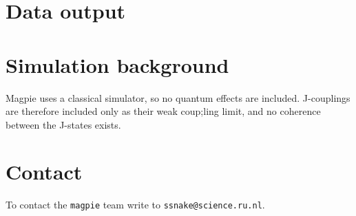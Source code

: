 \documentclass[11pt,a4paper]{article}
\begin{document}
\section{Data output}

\section{Simulation background}
Magpie uses a classical simulator, so no quantum effects are included. J-couplings are therefore included only as their weak coup;ling limit, and no coherence between the J-states exists.



\section{Contact}
To contact the \texttt{magpie} team write to \texttt{ssnake@science.ru.nl}.



\end{document}
